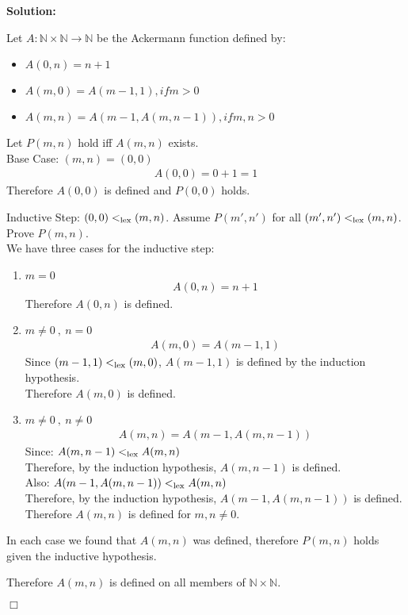 \documentclass[11pt,fleqn]{article}
\newcommand{\be}{\begin{enumerate}}
\newcommand{\ee}{\end{enumerate}}
\newcommand{\sglsp}{\ }
\newenvironment{proof}{\par\noindent{\bf Proof\sglsp}}{\hfill$\Box$}
\begin{document}
\medskip

\textbf{Solution:}

\medskip

\begin{proof}
	Let $A: \mathbb{N} \times \mathbb{N} \rightarrow \mathbb{N}$ be the Ackermann function defined by:
	\begin{itemize}
		\item $A(0,n) = n+1$
		\item $A(m,0) = A(m-1, 1), if m>0$
		\item $A(m,n) = A(m-1,A(m,n-1)), if m,n > 0$
	\end{itemize}

	Let $P(m,n)$ hold iff $A(m,n)$ exists.\\

	Base Case: $(m,n) = (0,0)$\\
	\begin{align*}
		A(0,0) = 0+1 = 1
	\end{align*}
	Therefore $A(0,0)$ is defined and $P(0,0)$ holds.
	
	Inductive Step: $(0,0) <_{\rm lex} (m,n)$. 
	Assume $P(m',n')$ for all $(m',n') <_{\rm lex} (m,n)$.
	Prove $P(m,n)$.\\
	
	We have three cases for the inductive step:
	\be
		\item $m = 0$\\
			\begin{align*}
				A(0,n) = n+1
			\end{align*}
			Therefore $A(0,n)$ is defined.
		\item $m \neq 0 ~,~ n = 0$\\
			\begin{align*}
				A(m,0) = A(m-1,1)
			\end{align*}
			Since $(m-1,1) <_{\rm lex} (m,0)$, $A(m-1,1)$ is defined by the induction hypothesis.\\
			Therefore $A(m,0)$ is defined.
		\item $m \neq 0 ~,~ n \neq 0$\\
			\begin{align*}
				A(m,n) = A(m-1, A(m,n-1))
			\end{align*}
			Since: $A(m,n-1) <_{\rm lex} A(m,n)$\\
			Therefore, by the induction hypothesis, $A(m,n-1)$ is defined.\\
			Also: $A(m-1, A(m,n-1)) <_{\rm lex} A(m,n)$\\
			Therefore, by the induction hypothesis, $A(m-1, A(m,n-1))$ is defined.\\
			Therefore $A(m,n)$ is defined for $m,n \neq 0$.
	\ee
	In each case we found that $A(m,n)$ was defined, therefore $P(m,n)$ holds given the inductive hypothesis.
	
	Therefore $A(m,n)$ is defined on all members of $\mathbb{N} \times \mathbb{N}$.
	
\end{proof}
\end{document}
